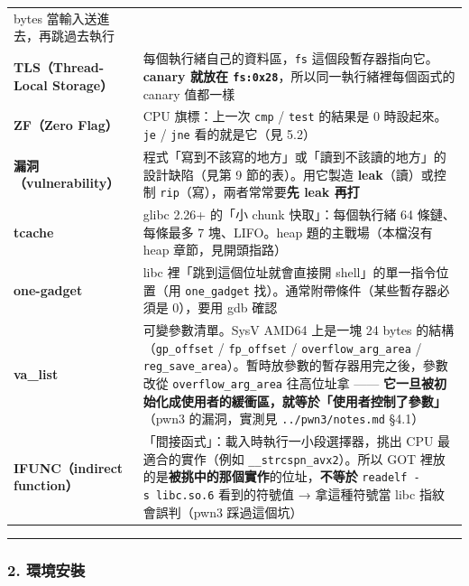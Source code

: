 \documentclass[10pt,a4paper]{article}
\begin{document}
{\begin{longtable}[]{@{}
  >{\raggedright\arraybackslash}p{}
  >{\raggedright\arraybackslash}p{}@{}}
bytes 當輸入送進去，再跳過去執行 \\
\textbf{TLS（Thread-Local Storage）} &
每個執行緒自己的資料區，\texttt{fs} 這個段暫存器指向它。\textbf{canary
就放在 \texttt{fs:\allowbreak{}0x28}}，所以同一執行緒裡每個函式的 canary 值都一樣 \\
\textbf{ZF（Zero Flag）} & CPU 旗標：上一次 \texttt{cmp} / \texttt{test}
的結果是 0 時設起來。\texttt{je} / \texttt{jne} 看的就是它（見 5.2） \\
\textbf{漏洞（vulnerability）} &
程式「寫到不該寫的地方」或「讀到不該讀的地方」的設計缺陷（見第 9
節的表）。用它製造 \textbf{leak}（讀）或控制
\texttt{rip}（寫），兩者常常要\textbf{先 leak 再打} \\
\textbf{tcache} & glibc 2.26+ 的「小 chunk 快取」：每個執行緒 64
條鏈、每條最多 7 塊、LIFO。heap 題的主戰場（本檔沒有 heap
章節，見開頭指路） \\
\textbf{one-gadget} & libc 裡「跳到這個位址就會直接開
shell」的單一指令位置（用 \texttt{one\_\allowbreak{}gadget}
找）。通常附帶條件（某些暫存器必須是 0），要用 gdb 確認 \\
\textbf{va\_list} & 可變參數清單。SysV AMD64 上是一塊 24 bytes
的結構（\texttt{gp\_\allowbreak{}offset} / \texttt{fp\_\allowbreak{}offset} /
\texttt{overflow\_\allowbreak{}arg\_\allowbreak{}area} /
\texttt{reg\_\allowbreak{}save\_\allowbreak{}area}）。暫時放參數的暫存器用完之後，參數改從
\texttt{overflow\_\allowbreak{}arg\_\allowbreak{}area} 往高位址拿 ------
\textbf{它一旦被初始化成使用者的緩衝區，就等於「使用者控制了參數」}（pwn3
的漏洞，實測見 \texttt{../\allowbreak{}pwn3/\allowbreak{}notes.\allowbreak{}md} §4.1） \\
\textbf{IFUNC（indirect function）} &
「間接函式」：載入時執行一小段選擇器，挑出 CPU 最適合的實作（例如
\texttt{\_\allowbreak{}\_\allowbreak{}strcspn\_\allowbreak{}avx2}）。所以 GOT
裡放的是\textbf{被挑中的那個實作}的位址，\textbf{不等於}
\texttt{readelf\ \allowbreak{}-\allowbreak{}s\ \allowbreak{}libc.\allowbreak{}so.\allowbreak{}6} 看到的符號值 → 拿這種符號當 libc
指紋會誤判（pwn3 踩過這個坑） \\
\end{longtable}
}

\begin{center}\rule{0.5\linewidth}{0.5pt}\end{center}

\subsubsection{2. 環境安裝}\label{ux74b0ux5883ux5b89ux88dd}
\end{document}
